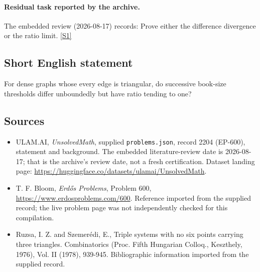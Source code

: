 \documentclass[11pt,a4paper]{article}
\newcommand{\sref}[2]{\hyperlink{source:#1:#2}{[S#2]}}
\begin{document}
\paragraph{Residual task reported by the archive.}

The embedded review (2026-08-17) records: Prove either the difference divergence or the ratio limit. \sref{2204}{1}

\subsection{Short English statement}

For dense graphs whose every edge is triangular, do successive book-size thresholds differ unboundedly but have ratio tending to one?

\subsection{Sources}

{\small

\begin{itemize}

\item[\hypertarget{source:2204:1}{S1}] ULAM.AI, \emph{UnsolvedMath}, supplied \texttt{problems.json}, record 2204 (EP-600), statement and background. The embedded literature-review date is 2026-08-17; that is the archive’s review date, not a fresh certification. Dataset landing page: \url{https://huggingface.co/datasets/ulamai/UnsolvedMath}.

\item[\hypertarget{source:2204:2}{S2}] T. F. Bloom, \emph{Erdős Problems}, Problem 600, \url{https://www.erdosproblems.com/600}. Reference imported from the supplied record; the live problem page was not independently checked for this compilation.

\item[\hypertarget{source:2204:3}{S3}] Ruzsa, I. Z. and Szemer\'{e}di, E., Triple systems with no six points carrying three triangles. Combinatorics (Proc. Fifth Hungarian Colloq., Keszthely, 1976), Vol. II (1978), 939-945. Bibliographic information imported from the supplied record.

\end{itemize}

}

\label{end:2204}
\end{document}
